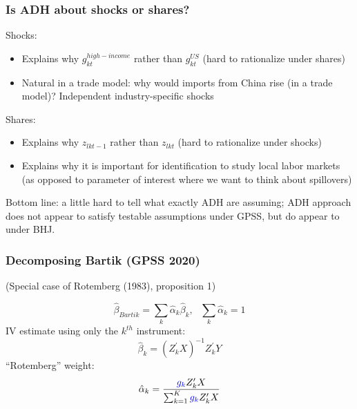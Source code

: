 \documentclass[notes,11pt, aspectratio=169]{beamer}
\begin{document}
\begin{frame}
\frametitle{Is ADH about shocks or shares?}

Shocks:
\begin{itemize}
\item  Explains why $g_{kt}^{high-income}$ rather than $g_{kt}^{US}$  (hard to rationalize under shares)
\item Natural in a trade model: why would imports from China rise (in a trade model)?  Independent industry-specific shocks
\end{itemize}

Shares:
\begin{itemize}
\item Explains why $z_{lkt-1}$ rather than $z_{lkt}$ (hard to rationalize under shocks)
\item Explains why it is important for identification to study local labor markets (as opposed to parameter of interest where we want to think about spillovers)
\end{itemize}

\medskip

Bottom line: a little hard to tell what exactly ADH are assuming; ADH approach does not appear to satisfy testable assumptions under GPSS, but do appear to under BHJ.
\end{frame}







\begin{frame}[label=rotemberg]
\frametitle{Decomposing Bartik (GPSS 2020)}
\begin{center}
(Special case of Rotemberg (1983), proposition 1)
\end{center}
\vspace{0.2in}




$$\hat{\beta}_{Bartik} =\sum_k  \hat{\alpha}_k \hat{\beta}_k , \text{      } \sum_k \hat{\alpha}_k=1$$   
IV estimate using only the $k^{th}$ instrument:
$$\hat{\beta}_k = (Z_k^\prime X)^{-1} Z_k^\prime Y$$
``Rotemberg'' weight:
$$ \hat{\alpha}_k = \frac{ \textcolor{blue}{g_k} Z_k^\prime X}{\sum_{k=1}^K \textcolor{blue}{g_k} Z_k^\prime X}$$



\hyperlink{rotproof}{}

\end{frame}
\end{document}
